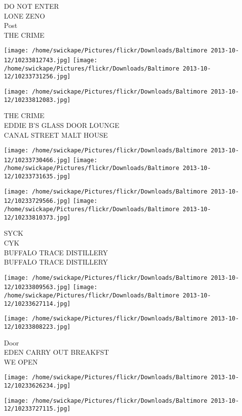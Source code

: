 \documentclass[10pt,letterpaper]{article}
\begin{document}
DO NOT ENTER\\
LONE ZENO\\
Post\\
THE CRIME
\pagebreak

\texttt{[image: /home/swickape/Pictures/flickr/Downloads/Baltimore 2013-10-12/10233812743.jpg]}
\texttt{[image: /home/swickape/Pictures/flickr/Downloads/Baltimore 2013-10-12/10233731256.jpg]}

\vspace{0.25in}
\texttt{[image: /home/swickape/Pictures/flickr/Downloads/Baltimore 2013-10-12/10233812083.jpg]}

THE CRIME\\
EDDIE B'S GLASS DOOR LOUNGE\\
CANAL STREET MALT HOUSE
\pagebreak

\texttt{[image: /home/swickape/Pictures/flickr/Downloads/Baltimore 2013-10-12/10233730466.jpg]}
\texttt{[image: /home/swickape/Pictures/flickr/Downloads/Baltimore 2013-10-12/10233731635.jpg]}

\texttt{[image: /home/swickape/Pictures/flickr/Downloads/Baltimore 2013-10-12/10233729566.jpg]}
\texttt{[image: /home/swickape/Pictures/flickr/Downloads/Baltimore 2013-10-12/10233810373.jpg]}

SYCK\\
CYK\\
BUFFALO TRACE DISTILLERY\\
BUFFALO TRACE DISTILLERY
\pagebreak

\texttt{[image: /home/swickape/Pictures/flickr/Downloads/Baltimore 2013-10-12/10233809563.jpg]}
\texttt{[image: /home/swickape/Pictures/flickr/Downloads/Baltimore 2013-10-12/10233627114.jpg]}

\texttt{[image: /home/swickape/Pictures/flickr/Downloads/Baltimore 2013-10-12/10233808223.jpg]}

Door\\
EDEN CARRY OUT BREAKFST\\
WE OPEN
\pagebreak

\texttt{[image: /home/swickape/Pictures/flickr/Downloads/Baltimore 2013-10-12/10233626234.jpg]}

\vspace{0.25in}
\texttt{[image: /home/swickape/Pictures/flickr/Downloads/Baltimore 2013-10-12/10233727115.jpg]}
\end{document}
